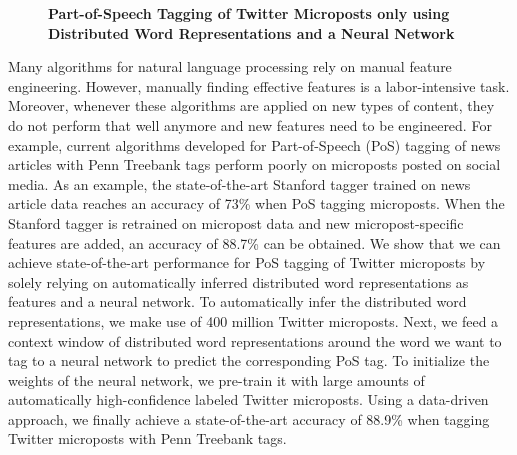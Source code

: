 \documentclass[10pt, a4paper, twopage, headinclude, footinclude, BCOR5mm]{scrartcl}
\begin{document}
\newpage

\begin{figure}[t!]
\centering
\large\textbf{Part-of-Speech Tagging of Twitter Microposts only using Distributed Word Representations and a Neural Network}
\vspace*{0.5cm}
\end{figure}


        \begin{table}[t!]
    \end{table}
        \begin{table}[t!]
    \end{table}

\noindent
Many algorithms for natural language processing rely on manual feature engineering. However, manually finding effective features is a labor-intensive task. Moreover, whenever these algorithms are applied on new types of content, they do not perform that well anymore and new features need to be engineered. For example, current algorithms developed for Part-of-Speech (PoS) tagging of news articles with Penn Treebank tags perform poorly on microposts posted on social media. As an example, the state-of-the-art Stanford tagger trained on news article data reaches an accuracy of 73\% when PoS tagging microposts. When the Stanford tagger is retrained on micropost data and new micropost-specific features are added, an accuracy of 88.7\% can be obtained.   We show that we can achieve state-of-the-art performance for PoS tagging of Twitter microposts by solely relying on automatically inferred distributed word representations as features and a neural network. To automatically infer the distributed word representations, we make use of 400 million Twitter microposts. Next, we feed a context window of distributed word representations around the word we want to tag to a neural network to predict the corresponding PoS tag. To initialize the weights of the neural network, we pre-train it with large amounts of automatically high-confidence labeled Twitter microposts. Using a data-driven approach, we finally achieve a state-of-the-art accuracy of 88.9\% when tagging Twitter microposts with Penn Treebank tags.
\end{document}
